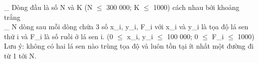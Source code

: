 \_ Dòng đầu là số N và K (N $\le$ 300 000; K $\le$ 1000) cách nhau bởi khoảng trắng   
\\   \_ N dòng sau mỗi dòng chứa 3 số x\_i, y\_i, F\_i với x\_i và y\_i là tọa độ lá sen thứ i và F\_i là số ruồi ở lá sen i.  (0  $\le$  x\_i, y\_i  $\le$  100 000; 0  $\le$  F\_i  $\le$ 1000)   
\\   Lưu ý: không có hai lá sen nào trùng tọa độ và luôn tồn tại ít nhất một đường đi từ 1 tới N.